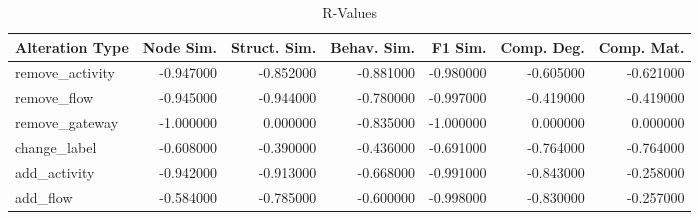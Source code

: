 \begin{table}
\caption{R-Values}
\label{tab:rvalues}
\begin{tabular}{lrrrrrr}
\toprule
Alteration Type & Node Sim. & Struct. Sim. & Behav. Sim. & F1 Sim. & Comp. Deg. & Comp. Mat. \\
\midrule
remove_activity & -0.947000 & -0.852000 & -0.881000 & -0.980000 & -0.605000 & -0.621000 \\
remove_flow & -0.945000 & -0.944000 & -0.780000 & -0.997000 & -0.419000 & -0.419000 \\
remove_gateway & -1.000000 & 0.000000 & -0.835000 & -1.000000 & 0.000000 & 0.000000 \\
change_label & -0.608000 & -0.390000 & -0.436000 & -0.691000 & -0.764000 & -0.764000 \\
add_activity & -0.942000 & -0.913000 & -0.668000 & -0.991000 & -0.843000 & -0.258000 \\
add_flow & -0.584000 & -0.785000 & -0.600000 & -0.998000 & -0.830000 & -0.257000 \\
\bottomrule
\end{tabular}
\end{table}
